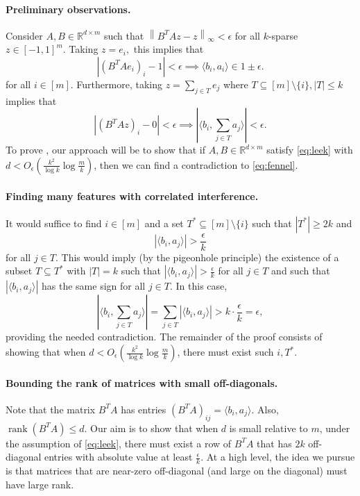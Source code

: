 \documentclass[11pt]{article}
\newcommand{\RR}{\mathbb{R}}
\newcommand{\norm}[1]{\left\|#1\right\|}
\DeclareMathOperator{\rank}{rank}
\begin{document}
\paragraph{Preliminary observations.} Consider $A,B\in \RR^{d\times m}$ such that
$\norm{B^TAz - z}_\infty < \epsilon$
for all $k$-sparse $z\in [-1,1]^m.$ Taking $z=e_i,$ this implies that
\begin{equation}\label{eq:leek}
    |(B^TAe_i)_i - 1| < \epsilon \implies \langle b_i, a_i\rangle \in 1\pm \epsilon.
\end{equation}
for all $i\in [m]$. Furthermore, taking $z=\sum_{j\in T}e_j$ where $T\subseteq [m]\setminus\{i\}, |T| \le k$ implies that
\begin{equation}\label{eq:fennel}
    |(B^TAz)_i - 0| < \epsilon \implies |\langle b_i, \sum_{j\in T}a_j\rangle| < \epsilon.
\end{equation}
To prove , our approach will be to show that if $A,B\in \RR^{d\times m}$ satisfy \eqref{eq:leek} with $d < O_\epsilon(\frac{k^2}{\log k} \log \frac{m}{k})$, then we can find a contradiction to \eqref{eq:fennel}.

\paragraph{Finding many features with correlated interference.}
It would suffice to find $i\in [m]$ and a set $T^*\subseteq [m]\setminus \{i\}$ such that $|T^*|\ge 2k$ and
\begin{equation}
    |\langle b_i, a_j\rangle| > \frac{\epsilon}{k}
\end{equation}
for all $j\in T.$ This would imply (by the pigeonhole principle) the existence of a subset $T\subseteq T^*$ with $|T|=k$ such that $|\langle b_i, a_j\rangle| > \frac{\epsilon}{k}$
for all $j\in T$ and such that $|\langle b_i, a_j\rangle|$ has the same sign for all $j\in T.$ In this case,
\begin{equation}
    |\langle b_i, \sum_{j\in T}a_j\rangle| = \sum_{j\in T} |\langle b_i, a_j\rangle| > k\cdot\frac{\epsilon}{k} = \epsilon,
\end{equation}
providing the needed contradiction. The remainder of the proof consists of showing that when $d < O_\epsilon(\frac{k^2}{\log k} \log \frac{m}{k})$, there must exist such $i, T^*$.

\paragraph{Bounding the rank of matrices with small off-diagonals.}
Note that the matrix $B^TA$ has entries $(B^TA)_{ij} = \langle b_i, a_j\rangle$. Also, $\rank(B^TA)\le d$. Our aim is to show that when $d$ is small relative to $m$, under the assumption of \eqref{eq:leek}, there must exist a row of $B^TA$ that has $2k$ off-diagonal entries with absolute value at least $\frac{\epsilon}{k}$. At a high level, the idea we pursue is that matrices that are near-zero off-diagonal (and large on the diagonal) must have large rank.
\end{document}
